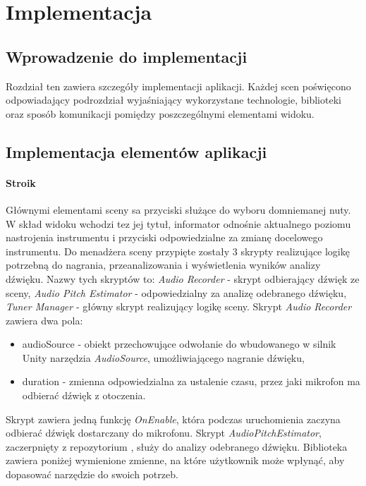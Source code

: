 \chapter{Implementacja}

\section{Wprowadzenie do implementacji}

Rozdział ten zawiera szczegóły implementacji aplikacji. Każdej scen poświęcono odpowiadający podrozdział wyjaśniający wykorzystane technologie, biblioteki oraz sposób komunikacji pomiędzy poszczególnymi elementami widoku. 

\section{Implementacja elementów aplikacji}

\subsubsection{Stroik}
Głównymi elementami sceny sa przyciski służące do wyboru domniemanej nuty. W skład widoku wchodzi tez jej tytuł, informator odnośnie aktualnego poziomu nastrojenia instrumentu i przyciski odpowiedzialne za zmianę docelowego instrumentu. Do menadżera sceny przypięte zostały 3 skrypty realizujące logikę potrzebną do nagrania, przeanalizowania i wyświetlenia wyników analizy dźwięku. Nazwy tych skryptów to: \emph{Audio Recorder} - skrypt odbierający dźwięk ze sceny, \emph{Audio Pitch Estimator} - odpowiedzialny za analizę odebranego dźwięku, \emph{Tuner Manager} - główny skrypt realizujący logikę sceny. Skrypt \emph{Audio Recorder} zawiera dwa pola:

\begin{itemize}
    \item audioSource - obiekt przechowujące odwołanie do wbudowanego w silnik Unity narzędzia \emph{AudioSource}, umożliwiającego nagranie dźwięku,
    \item duration - zmienna odpowiedzialna za ustalenie czasu, przez jaki mikrofon ma odbierać dźwięk z otoczenia.
\end{itemize}

Skrypt zawiera jedną funkcję \emph{OnEnable}, która podczas uruchomienia zaczyna odbierać dźwięk dostarczany do mikrofonu. Skrypt \emph{AudioPitchEstimator}, zaczerpnięty z repozytorium \cite{https://github.com/nakakq/AudioPitchEstimatorForUnity}, służy do analizy odebranego dźwięku. Biblioteka zawiera poniżej wymienione zmienne, na które użytkownik może wpłynąć, aby dopasować narzędzie do swoich potrzeb.

